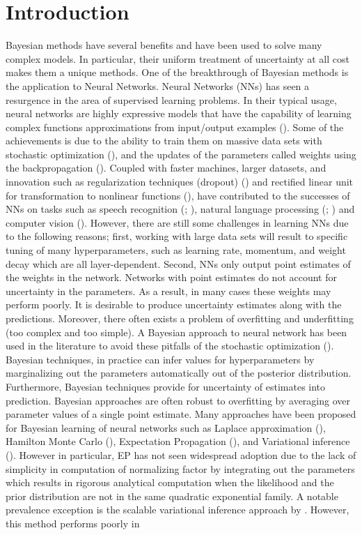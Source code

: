 \documentclass[]{article}
\begin{document}
\section{Introduction}
Bayesian methods have several benefits and have been used to solve many complex models. In particular, their uniform treatment of uncertainty at all cost makes them a unique methods. One of the breakthrough of Bayesian methods is the application to Neural Networks. Neural Networks (NNs) has seen a resurgence in the area of supervised learning problems. In their typical usage, neural networks are highly expressive models that have the capability of learning complex functions approximations from input/output examples (\cite{hornik1989}). Some of the achievements is due to the ability to train them on massive data sets with stochastic optimization (\cite{bottou2010}), and the updates of the parameters called weights using the backpropagation (\cite{rumelhart1986}). Coupled with faster machines, larger datasets, and innovation such as regularization techniques (dropout) (\cite{srivastava2014}) and rectified linear unit for transformation to nonlinear functions (\cite{nair2010}), have contributed to the successes of NNs on tasks such as speech recognition (\cite{hintonet2012}; \cite{Hannunetal2014}), natural language processing (\cite{collobert2008}; \cite{sutskever2014}) and computer vision (\cite{krizhevsky2012}). However, there are still some challenges in learning NNs due to the following reasons; first, working with large data sets will result to specific tuning of many hyperparameters, such as learning rate, momentum, and weight decay which are all layer-dependent. Second, NNs only output point estimates of the weights in the network. Networks with point estimates do not account for uncertainty in the parameters. As a result, in many cases these weights may perform poorly. It is desirable to produce uncertainty estimates along with the predictions. Moreover, there often exists a problem of overfitting and underfitting (too complex and too simple). A Bayesian approach to neural network has been used in the literature to avoid these pitfalls of the stochastic optimization (\cite{mackay1992c}). Bayesian techniques, in practice can infer values for hyperparameters by marginalizing out the parameters automatically out of the posterior distribution. Furthermore, Bayesian techniques provide for uncertainty of estimates into prediction. Bayesian approaches are often robust to overfitting by averaging over parameter values of a single point estimate. Many approaches have been proposed for Bayesian learning of neural networks such as Laplace approximation (\cite{mackay1992c}), Hamilton Monte Carlo (\cite{neal1995}), Expectation Propagation (\cite{Jylankietal2014}), and Variational inference (\cite{hintonandcamp1993}). However in particular, EP has not seen widespread adoption due to the lack of simplicity in computation of normalizing factor by integrating out the parameters which results in rigorous analytical computation when the likelihood and the prior distribution are not in the same quadratic exponential family. A notable prevalence exception is the scalable variational inference approach by \cite{grave2011vi}. However, this method performs poorly in 
\end{document}
